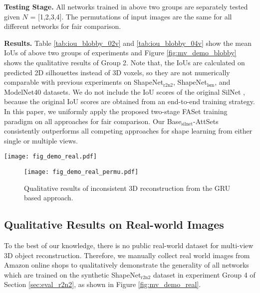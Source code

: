 \documentclass[twocolumn]{svjour3}    \pdfoutput=1
\newcommand{\faset}{FASet}
\begin{document}
\textbf{Testing Stage.} All networks trained in above two groups are separately tested given $N$ = [1,2,3,4]. The permutations of input images are the same for all different networks for fair comparison.

\textbf{Results.} Table \ref{tab:iou_blobby_02v} and \ref{tab:iou_blobby_04v} show the mean IoUs of above two groups of experiments and Figure \ref{fig:mv_demo_blobby} shows the qualitative results of Group 2. Note that, the IoUs are calculated on predicted 2D silhouettes instead of 3D voxels, so they are not numerically comparable with previous experiments on ShapeNet$_{\textrm{r2n2}}$, ShapeNet$_{\textrm{lsm}}$, and ModelNet40 datasets. We do not include the IoU scores of the original SilNet \citep{Wiles2017}, because the original IoU scores are obtained from an end-to-end training strategy. In this paper, we uniformly apply the proposed two-stage \faset{} training paradigm on all approaches for fair comparison. Our Base$_{\textrm{silnet}}$-AttSets consistently outperforms all competing approaches for shape learning from either single or multiple views.

\begin{figure*}[t]
\centering
   \texttt{[image: fig\_demo\_real.pdf]}
\caption{Qualitative results of multi-view 3D reconstruction from real-world images.}
\label{fig:mv_demo_real}
\vspace{-0.3cm}
\end{figure*}
\begin{figure}[t]
\centering
   \texttt{[image: fig\_demo\_real\_permu.pdf]}
\caption{Qualitative results of inconsistent 3D reconstruction from the GRU based approach.}
\label{fig:mv_demo_real_permu}
\vspace{-0.3cm}
\end{figure}

\vspace{-0.6cm}
\subsection{Qualitative Results on Real-world Images}
To the best of our knowledge, there is no public real-world dataset for multi-view 3D object reconstruction. Therefore, we manually collect real world images from Amazon online shops to qualitatively demonstrate the generality of all networks which are trained on the synthetic ShapeNet$_{\textrm{r2n2}}$ dataset in experiment Group 4 of Section \ref{sec:eval_r2n2}, as shown in Figure \ref{fig:mv_demo_real}.
\end{document}
